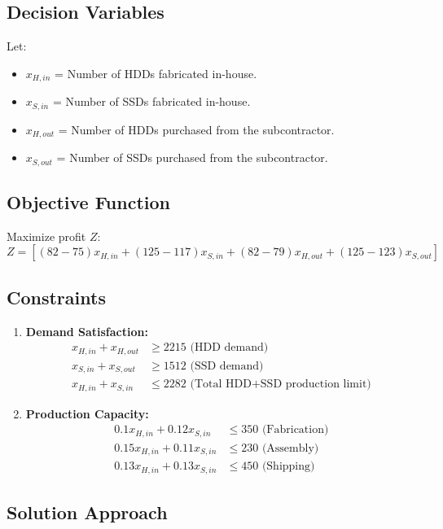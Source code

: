 \documentclass[12pt]{article}
\begin{document}
\subsection*{Decision Variables}
Let:
\begin{itemize}
    \item \( x_{H,in} \) = Number of HDDs fabricated in-house.
    \item \( x_{S,in} \) = Number of SSDs fabricated in-house.
    \item \( x_{H,out} \) = Number of HDDs purchased from the subcontractor.
    \item \( x_{S,out} \) = Number of SSDs purchased from the subcontractor.
\end{itemize}

\subsection*{Objective Function}
Maximize profit \( Z \):
\[
Z = [(82 - 75)x_{H,in} + (125 - 117)x_{S,in} + (82 - 79)x_{H,out} + (125 - 123)x_{S,out}]
\]

\subsection*{Constraints}

\begin{enumerate}
    \item \textbf{Demand Satisfaction:}
    \begin{align*}
    x_{H,in} + x_{H,out} &\geq 2215 \text{ (HDD demand)} \\
    x_{S,in} + x_{S,out} &\geq 1512 \text{ (SSD demand)} \\
    x_{H,in} + x_{S,in} &\leq 2282 \text{ (Total HDD+SSD production limit)}
    \end{align*}
    
    \item \textbf{Production Capacity:}
    \begin{align*}
    0.1x_{H,in} + 0.12x_{S,in} &\leq 350 \text{ (Fabrication)} \\
    0.15x_{H,in} + 0.11x_{S,in} &\leq 230 \text{ (Assembly)} \\
    0.13x_{H,in} + 0.13x_{S,in} &\leq 450 \text{ (Shipping)}
    \end{align*}
\end{enumerate}

\subsection*{Solution Approach}
\end{document}
